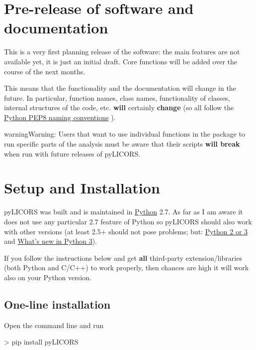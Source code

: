 \documentclass[letterpaper,10pt,english]{sphinxmanual}
\begin{document}
\chapter{Pre-release of software and documentation}
\label{index:pylicors-documentation}\label{index:pre-release-of-software-and-documentation}
This is a very first planning release of the software: the main features are not available yet,
it is just an initial draft. Core functions will be added over the course of the next months.

This means that the functionality and the documentation will change in the future. In
particular, function names, class names, functionality of classes,
internal structures of the code, etc. \textbf{will} certainly \textbf{change} (so all follow the \href{http://www.python.org/dev/peps/pep-0008/}{Python PEP8
naming conventions} ).

\begin{notice}{warning}{Warning:}
Users that want to use individual functions in the package to run specific parts of the analysis
must be aware that their scripts \textbf{will break} when run with future releases of pyLICORS.
\end{notice}


\chapter{Setup and Installation}
\label{index:setup-and-installation}
pyLICORS was built and is maintained in \href{http://www.python.org}{Python} 2.7.
As far as I am aware it does not use any particular 2.7 feature of
Python so pyLICORS should also work with other versions
(at least 2.5+ should not pose problems; but:
\href{http://wiki.python.org/moin/Python2orPython3}{Python 2 or 3} and
\href{http://docs.python.org/release/3.0.1/whatsnew/3.0.html}{What's new in Python 3}).

If you follow the instructions below and get \textbf{all} third-party
extension/libraries (both Python and C/C++) to work properly, then
chances are high it will work also on your Python version.


\section{One-line installation}
\label{installation:installation}\label{installation::doc}\label{installation:one-line-installation}
Open the command line and run

\textgreater{} pip install pyLICORS
\end{document}
